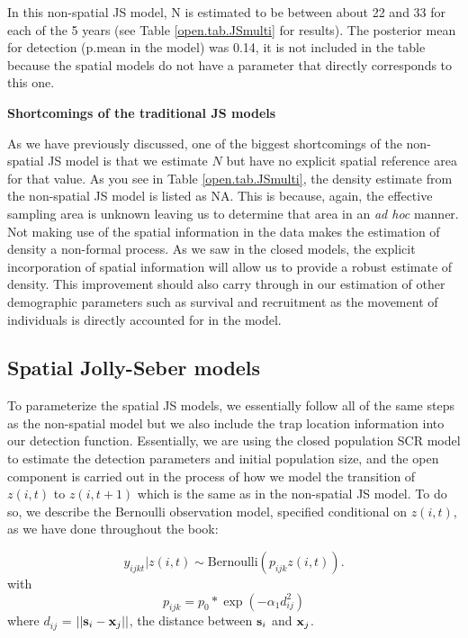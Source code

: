 In this non-spatial JS model, N is estimated to be between about 22 and 33 for each of the 5 years (see
Table \ref{open.tab.JSmulti} for results).  The posterior mean for 
detection (p.mean in the model) was 0.14, it
is not included in the table because the spatial models do not have 
a parameter that directly corresponds to this one.


{\bf Shortcomings of the traditional JS models}

As we have previously discussed, one of the biggest shortcomings of the non-spatial
JS model is that we estimate $N$ but have no explicit spatial reference area for that
value.  As you see in Table \ref{open.tab.JSmulti}, the density estimate from the non-spatial JS model
is listed as NA.  This is because, again, the effective sampling area is unknown leaving us to
determine that area in an { \it ad hoc} manner.
Not making use of the
spatial information in the data makes
the estimation of density
a non-formal process.  As we saw in the closed models, the explicit
incorporation of spatial information will allow us to provide a robust estimate of density.  
This improvement should
also carry through in our estimation of other demographic parameters
such as survival and recruitment as the movement of individuals is directly accounted for in the
model.


\subsection{Spatial Jolly-Seber models}

To parameterize the spatial JS models, we essentially follow all of the same steps
as the non-spatial model but we also include the trap location information into our
detection function.  Essentially, we are using the closed population SCR model to estimate
the detection parameters and initial population size,
and the open component is carried out in the process of how we model the transition
of $z(i,t)$ to $z(i, t+1)$ which is the same as in the non-spatial JS model.
To do so, we describe the Bernoulli observation model,
specified conditional on $z(i,t)$, as we have done throughout the book:

\[
  y_{ijkt}|z(i,t) \sim
\mbox{Bernoulli}(p_{ijk} z(i,t)).
\]
with
\begin{equation}
p_{ijk} = p_{0}*\exp(-\alpha_{1} d_{ij}^2)
\label{scr0.eq.norm}
\end{equation}
where $d_{ij}$ = $||{\bf s}_{i}-{\bf x}_{j}||$, the distance between
${\bf s}_{i}$ and ${\bf x}_{j}$.

